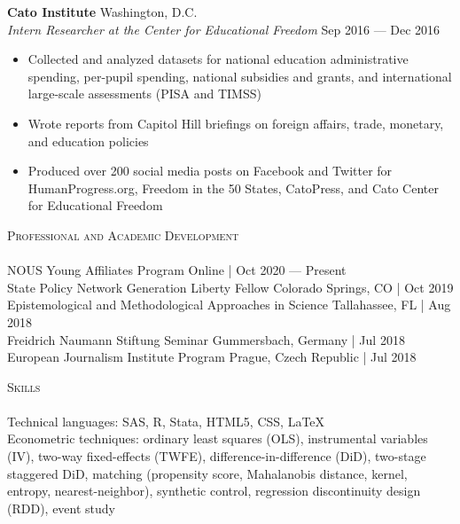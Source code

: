 \documentclass[a4paper,11pt]{article}
\newcommand{\lineunder} {
    \vspace*{-8pt} \\
    \hspace*{-18pt} \hrulefill \\
}
\newcommand{\header} [1] {
    {\hspace*{-18pt}\vspace*{6pt} \textsc{\large{#1}}}
    \vspace*{-6pt} \lineunder
}
\begin{document}
\textbf{Cato Institute} \hfill Washington, D.C.\\
\textit{Intern Researcher at the Center for Educational Freedom} \hfill Sep 2016 --- Dec 2016\\
\begin{itemize}[noitemsep,nolistsep]
    \item Collected and analyzed datasets for national education administrative spending, per-pupil spending, national subsidies and grants, and international large-scale assessments (PISA and TIMSS)
    \item Wrote reports from Capitol Hill briefings on foreign affairs, trade, monetary, and education policies
    \item Produced over 200 social media posts on Facebook and Twitter for HumanProgress.org, Freedom in the 50 States, CatoPress, and Cato Center for Educational Freedom
\end{itemize}
\vspace{1mm}
\header{Professional and Academic Development}

NOUS Young Affiliates Program \hfill Online | Oct 2020 --- Present \\

State Policy Network Generation Liberty Fellow \hfill Colorado Springs, CO | Oct 2019 \\

Epistemological and Methodological Approaches in Science \hfill Tallahassee, FL | Aug 2018\\

Freidrich Naumann Stiftung Seminar \hfill Gummersbach, Germany | Jul 2018\\

European Journalism Institute Program \hfill Prague, Czech Republic | Jul 2018 \\

\vspace{1mm}
\header{Skills}
Technical languages: SAS, R, Stata, HTML5, CSS, \LaTeX \\

Econometric techniques: ordinary least squares (OLS), instrumental variables (IV), two-way fixed-effects (TWFE), difference-in-difference (DiD), two-stage staggered DiD, matching (propensity score, Mahalanobis distance, kernel, entropy, nearest-neighbor), synthetic control, regression discontinuity design (RDD), event study
\end{document}
